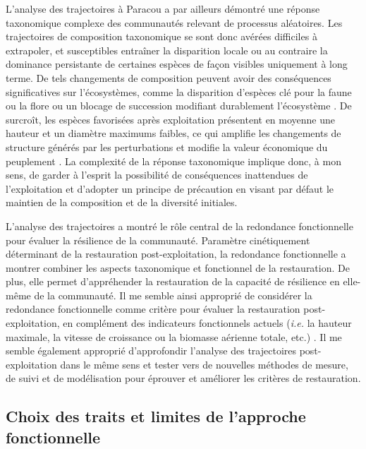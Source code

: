 \documentclass[
  11pt,
  french,
  A4paper,
  extrafontsizes,onecolumn,openright
  ]{memoir}
\begin{document}
L'analyse des trajectoires à Paracou a par ailleurs démontré une réponse
taxonomique complexe des communautés relevant de processus aléatoires.
Les trajectoires de composition taxonomique se sont donc avérées
difficiles à extrapoler, et susceptibles entraîner la disparition locale
ou au contraire la dominance persistante de certaines espèces de façon
visibles uniquement à long terme. De tels changements de composition
peuvent avoir des conséquences significatives sur l'écosystèmes, comme
la disparition d'espèces clé pour la faune ou la flore ou un blocage de
succession modifiant durablement l'écosystème \autocite{Diaz2005}. De
surcroît, les espèces favorisées après exploitation présentent en
moyenne une hauteur et un diamètre maximums faibles, ce qui amplifie les
changements de structure générés par les perturbations et modifie la
valeur économique du peuplement \autocite{Rutishauser2016}. La
complexité de la réponse taxonomique implique donc, à mon sens, de
garder à l'esprit la possibilité de conséquences inattendues de
l'exploitation et d'adopter un principe de précaution en visant par
défaut le maintien de la composition et de la diversité initiales.

L'analyse des trajectoires a montré le rôle central de la redondance
fonctionnelle pour évaluer la résilience de la communauté. Paramètre
cinétiquement déterminant de la restauration post-exploitation, la
redondance fonctionnelle a montrer combiner les aspects taxonomique et
fonctionnel de la restauration. De plus, elle permet d'appréhender la
restauration de la capacité de résilience en elle-même de la communauté.
Il me semble ainsi approprié de considérer la redondance fonctionnelle
comme critère pour évaluer la restauration post-exploitation, en
complément des indicateurs fonctionnels actuels (\emph{i.e.} la hauteur
maximale, la vitesse de croissance ou la biomasse aérienne totale, etc.)
\autocite{Sist2015}. Il me semble également approprié d'approfondir
l'analyse des trajectoires post-exploitation dans le même sens et tester
vers de nouvelles méthodes de mesure, de suivi et de modélisation pour
éprouver et améliorer les critères de restauration.

\subsection{Choix des traits et limites de l'approche
fonctionnelle}\label{choix-des-traits-et-limites-de-lapproche-fonctionnelle}
\end{document}
